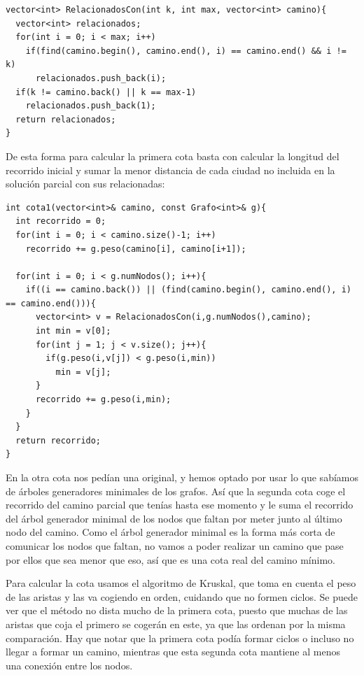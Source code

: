 \begin{lstlisting}
vector<int> RelacionadosCon(int k, int max, vector<int> camino){
  vector<int> relacionados;
  for(int i = 0; i < max; i++)
    if(find(camino.begin(), camino.end(), i) == camino.end() && i != k)
      relacionados.push_back(i);
  if(k != camino.back() || k == max-1)
    relacionados.push_back(1);
  return relacionados;
}
\end{lstlisting}

De esta forma para calcular la primera cota basta con calcular la longitud del recorrido inicial y sumar la menor distancia de cada ciudad no incluida en la solución parcial con sus relacionadas:

\begin{lstlisting}
int cota1(vector<int>& camino, const Grafo<int>& g){
  int recorrido = 0;
  for(int i = 0; i < camino.size()-1; i++)
    recorrido += g.peso(camino[i], camino[i+1]);

  for(int i = 0; i < g.numNodos(); i++){
    if((i == camino.back()) || (find(camino.begin(), camino.end(), i) == camino.end())){
      vector<int> v = RelacionadosCon(i,g.numNodos(),camino);
      int min = v[0];
      for(int j = 1; j < v.size(); j++){
        if(g.peso(i,v[j]) < g.peso(i,min))
          min = v[j];
      }
      recorrido += g.peso(i,min);
    }
  }
  return recorrido;
}
\end{lstlisting}

En la otra cota nos pedían una original, y hemos optado por usar lo que sabíamos de árboles generadores minimales de los grafos. Así que la segunda cota coge el recorrido del camino parcial que tenías hasta ese momento y le suma el recorrido del árbol generador minimal de los nodos que faltan por meter junto al último nodo del camino. Como el árbol generador minimal es la forma más corta de comunicar los nodos que faltan, no vamos a poder realizar un camino que pase por ellos que sea menor que eso, así que es una cota real del camino mínimo.

Para calcular la cota usamos el algoritmo de Kruskal, que toma en cuenta el peso de las aristas y las va cogiendo en orden, cuidando que no formen ciclos. Se puede ver que el método no dista mucho de la primera cota, puesto que muchas de las aristas que coja el primero se cogerán en este, ya que las ordenan por la misma comparación. Hay que notar que la primera cota podía formar ciclos o incluso no llegar a formar un camino, mientras que esta segunda cota mantiene al menos una conexión entre los nodos.

